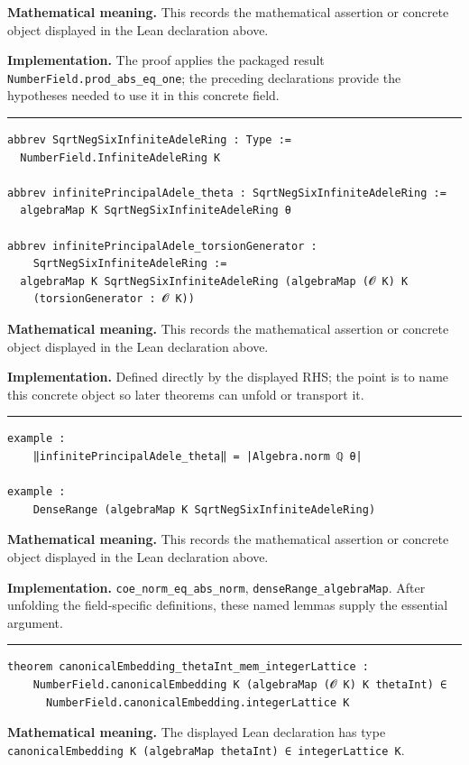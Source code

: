 \documentclass[UTF8,a4paper,11pt,fontset=fandol]{ctexart}
\theoremstyle{definition}
\newcommand{\statementsep}{\par\medskip\hrule\medskip}
\begin{document}
\noindent\textbf{Mathematical meaning.} This records the mathematical assertion or concrete object displayed in the Lean declaration above.\par
\noindent\textbf{Implementation.} The proof applies the packaged result \texttt{NumberField.\allowbreak{}prod\_\allowbreak{}abs\_\allowbreak{}eq\_\allowbreak{}one}; the preceding declarations provide the hypotheses needed to use it in this concrete field.\par
\statementsep
\begin{verbatim}
abbrev SqrtNegSixInfiniteAdeleRing : Type :=
  NumberField.InfiniteAdeleRing K

abbrev infinitePrincipalAdele_theta : SqrtNegSixInfiniteAdeleRing :=
  algebraMap K SqrtNegSixInfiniteAdeleRing θ

abbrev infinitePrincipalAdele_torsionGenerator :
    SqrtNegSixInfiniteAdeleRing :=
  algebraMap K SqrtNegSixInfiniteAdeleRing (algebraMap (𝓞 K) K
    (torsionGenerator : 𝓞 K))
\end{verbatim}
\noindent\textbf{Mathematical meaning.} This records the mathematical assertion or concrete object displayed in the Lean declaration above.\par
\noindent\textbf{Implementation.} Defined directly by the displayed RHS; the point is to name this concrete object so later theorems can unfold or transport it.\par
\statementsep
\begin{verbatim}
example :
    ‖infinitePrincipalAdele_theta‖ = |Algebra.norm ℚ θ|

example :
    DenseRange (algebraMap K SqrtNegSixInfiniteAdeleRing)
\end{verbatim}
\noindent\textbf{Mathematical meaning.} This records the mathematical assertion or concrete object displayed in the Lean declaration above.\par
\noindent\textbf{Implementation.} \texttt{coe\_\allowbreak{}norm\_\allowbreak{}eq\_\allowbreak{}abs\_\allowbreak{}norm}, \texttt{denseRange\_\allowbreak{}algebraMap}. After unfolding the field-specific definitions, these named lemmas supply the essential argument.\par
\statementsep
\begin{verbatim}
theorem canonicalEmbedding_thetaInt_mem_integerLattice :
    NumberField.canonicalEmbedding K (algebraMap (𝓞 K) K thetaInt) ∈
      NumberField.canonicalEmbedding.integerLattice K
\end{verbatim}
\noindent\textbf{Mathematical meaning.} The displayed Lean declaration has type \texttt{canonicalEmbedding K (algebraMap thetaInt) ∈ integerLattice K}.\par
\end{document}
